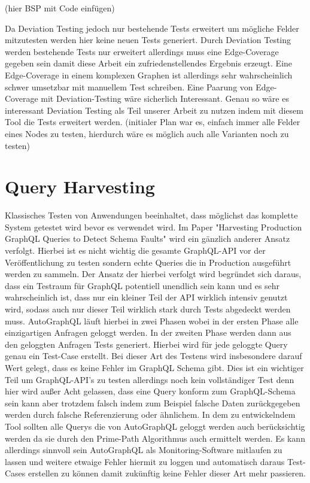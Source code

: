 (hier BSP mit Code einfügen)

Da Deviation Testing jedoch nur bestehende Tests erweitert um mögliche Felder mitzutesten werden hier keine neuen Tests generiert.
Durch Deviation Testing werden bestehende Tests nur erweitert allerdings muss eine Edge-Coverage gegeben sein damit diese Arbeit
ein zufriedenstellendes Ergebnis erzeugt. Eine Edge-Coverage in einem komplexen Graphen ist allerdings sehr wahrscheinlich
schwer umsetzbar mit manuellem Test schreiben. Eine Paarung von Edge-Coverage mit Deviation-Testing wäre sicherlich Interessant.
Genau so wäre es interessant Deviation Testing als Teil unserer Arbeit zu nutzen indem mit diesem Tool die Tests erweitert werden.
(initialer Plan war es, einfach immer alle Felder eines Nodes zu testen, hierdurch wäre es möglich auch alle Varianten noch zu testen)

\section{Query Harvesting}

Klassisches Testen von Anwendungen beeinhaltet, dass möglichst das komplette System getestet wird bevor es verwendet wird.
Im Paper "Harvesting Production GraphQL Queries to Detect Schema Faults" wird ein gänzlich anderer Ansatz verfolgt.
Hierbei ist es nicht wichtig die gesamte GraphQL-API vor der Veröffentlichung zu testen sondern
echte Queries die in Production ausgeführt werden zu sammeln.
Der Ansatz der hierbei verfolgt wird begründet sich daraus,
dass ein Testraum für GraphQL potentiell unendlich sein kann und es sehr wahrscheinlich ist, dass nur ein kleiner
Teil der API wirklich intensiv genutzt wird, sodass auch nur dieser Teil wirklich stark durch Tests abgedeckt werden muss.
AutoGraphQL läuft hierbei in zwei Phasen wobei in der ersten Phase alle einzigartigen Anfragen geloggt werden.
In der zweiten Phase werden dann aus den geloggten Anfragen Tests generiert.
Hierbei wird für jede geloggte Query genau ein Test-Case erstellt.
Bei dieser Art des Testens wird insbesondere darauf Wert gelegt, dass es keine Fehler im GraphQL Schema gibt.
Dies ist ein wichtiger Teil um GraphQL-API's zu testen allerdings noch kein vollständiger Test denn hier wird außer Acht gelassen,
dass eine Query konform zum GraphQL-Schema sein kann aber trotzdem falsch indem zum Beispiel falsche Daten zurückgegeben werden
durch falsche Referenzierung oder ähnlichem.
In dem zu entwickelndem Tool sollten alle Querys die von AutoGraphQL geloggt werden auch berücksichtig werden da sie durch
den Prime-Path Algorithmus auch ermittelt werden.
Es kann allerdings sinnvoll sein AutoGraphQL als Monitoring-Software mitlaufen zu lassen und weitere etwaige Fehler hiermit zu loggen
und automatisch daraus Test-Cases erstellen zu können damit zukünftig keine Fehler dieser Art mehr passieren.

